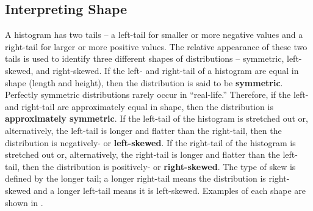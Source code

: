 \documentclass[10pt,openany]{book}\usepackage[]{graphicx}\usepackage[]{color}
\begin{document}
\subsection{Interpreting Shape}
A histogram has two tails -- a left-tail for smaller or more negative values and a right-tail for larger or more positive values.  The relative appearance of these two tails is used to identify three different shapes of distributions -- symmetric, left-skewed, and right-skewed.  If the left- and right-tail of a histogram are equal in shape (length and height), then the distribution is said to be \textbf{symmetric}.  Perfectly symmetric distributions rarely occur in ``real-life.''  Therefore, if the left- and right-tail are approximately equal in shape, then the distribution is \textbf{approximately symmetric}.  If the left-tail of the histogram is stretched out or, alternatively, the left-tail is longer and flatter than the right-tail, then the distribution is negatively- or \textbf{left-skewed}.  If the right-tail of the histogram is stretched out or, alternatively, the right-tail is longer and flatter than the left-tail, then the distribution is positively- or \textbf{right-skewed}.  The type of skew is defined by the longer tail; a longer right-tail means the distribution is right-skewed and a longer left-tail means it is left-skewed.  Examples of each shape are shown in .
\end{document}
